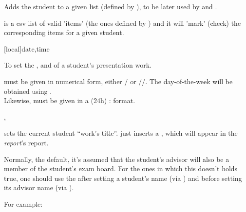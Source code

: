 \documentclass[article,nogeometry,english,tocdepth=3,secdepth=3]{ufrgscca} %
\begin{document}
\begin{codedescribe}[code,new=2023/12/04]{\studentaddtolist}
	\begin{codesyntax}%
	\end{codesyntax}
Adds the student to a given list (defined by ), to be later used by \tsobj{\sortstudentlist} and \tsobj{\tcreport}.
\end{codedescribe}

\begin{codedescribe}{\checklist}
    \begin{codesyntax}%
    \end{codesyntax}
     is a csv list of valid 'items' (the ones defined by \tsmacro{\checkdef}{}) and it will 'mark' (check) the corresponding items for a given student.
\end{codedescribe}


\begin{codedescribe}[code,update=2023/11/29]{\timeslot}
	\begin{codesyntax}%
		\tsmacro{\timeslot}[local]{date,time}
	\end{codesyntax}
To set the ,  and  of a student's presentation work.
\end{codedescribe}

\begin{tsremark}
 must be given in numerical form, either / or //. The day-of-the-week will be obtained  using .\\ Likewise,  must be given in a (24h) :  format.
\end{tsremark}



\begin{codedescribe}[code,update=2023/11/18]{\worktitle,\studentremark}
	\begin{codesyntax}%
		\tsmacro{\worktitle}{title}
		\tsmacro{\studentremark}{remark}
	\end{codesyntax}
\end{codedescribe}
\tsmacro{\worktitle}{} sets the current student “work's title”. \tsmacro{\studentremark}{} just inserts a , which will appear in the \emph{report}'s report.


\begin{codedescribe}[code,update=2023/11/18]{\distinctboard}
	\begin{codesyntax}%
		\tsmacro{\distinctboard}{}
	\end{codesyntax}
Normally, the default, it's assumed that the student's advisor will also be a member of the student's exam board. For the ones in which this doesn't holds true, one should use the \tsmacro{\distinctboard}{} after setting a student's name (via \tsmacro{\student}{}) and before setting its advisor name (via \tsmacro{\advisor}{}). 
\end{codedescribe}
For example:
\end{document}
